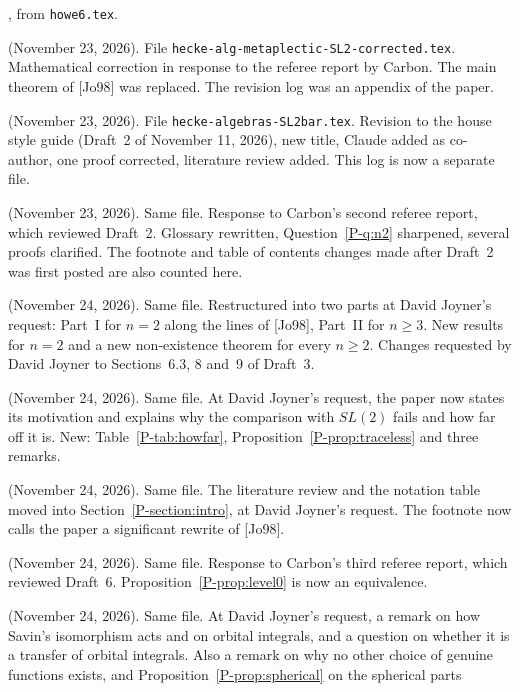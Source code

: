 \documentclass[12pt,letterpaper]{amsart}
\begin{document}
\begin{description}[leftmargin=1.5em,style=nextline]
\item[Original] [Jo98], from \texttt{howe6.tex}.
\item[Draft 1] (November 23, 2026). File
\texttt{hecke-alg-metaplectic-SL2-corrected.tex}. Mathematical
correction in response to the referee report by Carbon. The main
theorem of [Jo98] was replaced. The revision log was an appendix of the
paper.
\item[Draft 2] (November 23, 2026). File
\texttt{hecke-algebras-SL2bar.tex}. Revision to the house style guide
(Draft~2 of November 11, 2026), new title, Claude added as co-author,
one proof corrected, literature review added. This log is now a
separate file.
\item[Draft 3] (November 23, 2026). Same file. Response to Carbon's
second referee report, which reviewed Draft~2. Glossary rewritten,
Question~\ref{P-q:n2} sharpened, several proofs clarified. The
footnote and table of contents changes made after Draft~2 was first
posted are also counted here.
\item[Draft 4] (November 24, 2026). Same file. Restructured into two
parts at David Joyner's request: Part~I for $n=2$ along the lines of
[Jo98], Part~II for $n\geq 3$. New results for $n=2$ and a new
non-existence theorem for every $n\geq 2$. Changes requested by David
Joyner to Sections~6.3, 8 and~9 of Draft~3.
\item[Draft 5] (November 24, 2026). Same file. At David Joyner's
request, the paper now states its motivation and explains why the
comparison with $SL(2)$ fails and how far off it is. New:
Table~\ref{P-tab:howfar}, Proposition~\ref{P-prop:traceless} and three
remarks.
\item[Draft 6] (November 24, 2026). Same file. The literature review
and the notation table moved into Section~\ref{P-section:intro}, at
David Joyner's request. The footnote now calls the paper a significant
rewrite of [Jo98].
\item[Draft 7] (November 24, 2026). Same file. Response to Carbon's
third referee report, which reviewed Draft~6. Proposition~\ref{P-prop:level0}
is now an equivalence.
\item[Draft 8] (November 24, 2026). Same file. At David Joyner's
request, a remark on how Savin's isomorphism acts and on orbital
integrals, and a question on whether it is a transfer of orbital
integrals. Also a remark on why no other choice of genuine functions
exists, and Proposition~\ref{P-prop:spherical} on the spherical parts

\end{description}
\end{document}
